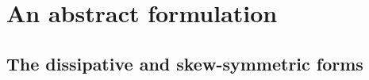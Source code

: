 \documentclass[11pt,a4paper]{article}
\newcommand{\bs}{\boldsymbol}
\newcommand{\dd}{\,\mathrm d}
\DeclareMathOperator{\curl}{curl}
\theoremstyle{definition}
\numberwithin{equation}{section}
\begin{document}


\section{An abstract formulation}\label{sec:abstract}
\subsection{The dissipative and skew-symmetric forms}
\end{document}

